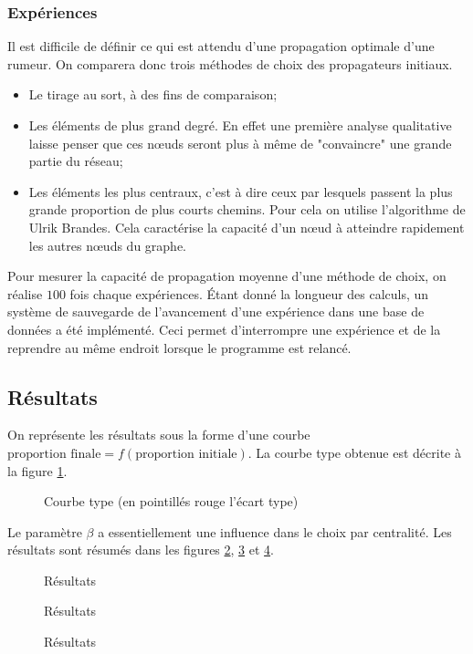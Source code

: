 \documentclass{article}
\newcommand{\resultat}[2]{
  \begin{figure}[!htb]
  \centering
  
  \caption{#2}
  \label{#1}
  \end{figure}
}
\begin{document}
\subsubsection{Expériences}
Il est difficile de définir ce qui est attendu d'une propagation optimale d'une rumeur. On comparera donc trois méthodes de choix des propagateurs initiaux.
\begin{itemize}
  \item Le tirage au sort, à des fins de comparaison;
  \item Les éléments de plus grand degré. En effet une première analyse qualitative laisse penser que ces nœuds seront plus à même de "convaincre" une grande partie du réseau;
  \item Les éléments les plus centraux, c'est à dire ceux par lesquels passent la plus grande proportion de plus courts chemins. Pour cela on utilise l'algorithme de Ulrik Brandes. Cela caractérise la capacité d'un nœud à atteindre rapidement les autres nœuds du graphe.
\end{itemize}

Pour mesurer la capacité de propagation moyenne d'une méthode de choix, on réalise $100$ fois chaque expériences. Étant donné la longueur des calculs, un système de sauvegarde de l'avancement d'une expérience dans une base de données a été implémenté. Ceci permet d'interrompre une expérience et de la reprendre au même endroit lorsque le programme est relancé.

\subsection{Résultats}
On représente les résultats sous la forme d'une courbe $\text{proportion finale}=f(\text{proportion initiale})$. La courbe type obtenue est décrite à la figure \ref{random_finale_f_initiale_q50_Beta50_ec}.

\resultat{random_finale_f_initiale_q50_Beta50_ec}{Courbe type (en pointillés rouge l'écart type)}

Le paramètre $\beta$ a essentiellement une influence dans le choix par centralité. Les résultats sont résumés dans les figures \ref{resultats1}, \ref{resultats2} et \ref{resultats3}.
\begin{figure}
\centering

\caption{Résultats}
\label{resultats1}
\end{figure}
\begin{figure}
\centering

\caption{Résultats}
\label{resultats2}
\end{figure}
\begin{figure}
\centering

\caption{Résultats}
\label{resultats3}
\end{figure}
\end{document}
